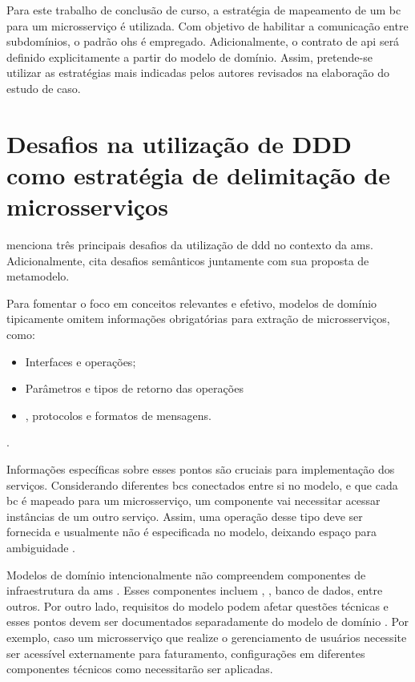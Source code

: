 Para este trabalho de conclusão de curso, a estratégia de mapeamento de um \acrshort{bc} para um microsserviço é utilizada. Com objetivo de habilitar a comunicação entre subdomínios, o padrão \acrfull{ohs} é empregado. Adicionalmente, o contrato de \acrshort{api} será definido explicitamente a partir do modelo de domínio. Assim, pretende-se utilizar as estratégias mais indicadas pelos autores revisados na elaboração do estudo de caso.

\section{Desafios na utilização de DDD como estratégia de delimitação de microsserviços}
 menciona três principais desafios da utilização de \acrshort{ddd} no contexto da \acrshort{ams}. Adicionalmente,  cita desafios semânticos juntamente com sua proposta de metamodelo.

Para fomentar o foco em conceitos relevantes e  efetivo, modelos de domínio tipicamente omitem informações obrigatórias para extração de microsserviços, como:
\begin{itemize}
    \item Interfaces e operações;
    \item Parâmetros e tipos de retorno das operações
    \item {}, protocolos e formatos de mensagens.
\end{itemize}
\cite{Rademacher201836}.

Informações específicas sobre esses pontos são cruciais para implementação dos serviços. Considerando diferentes \acrshort{bc}s conectados entre si no modelo, e que cada \acrshort{bc} é mapeado para um microsserviço, um componente vai necessitar acessar instâncias de um outro serviço. Assim, uma operação desse tipo deve ser fornecida e usualmente não é especificada no modelo, deixando espaço para ambiguidade \cite{Rademacher201836}.

Modelos de domínio intencionalmente não compreendem componentes de infraestrutura da \acrshort{ams} \cite{Rademacher201836}. Esses componentes incluem , , banco de dados, entre outros. Por outro lado, requisitos do modelo podem afetar questões técnicas e esses pontos devem ser documentados separadamente do modelo de domínio \cite{Rademacher201836}. Por exemplo, caso um microsserviço que realize o gerenciamento de usuários necessite ser acessível externamente para faturamento, configurações em diferentes componentes técnicos como  necessitarão ser aplicadas.

